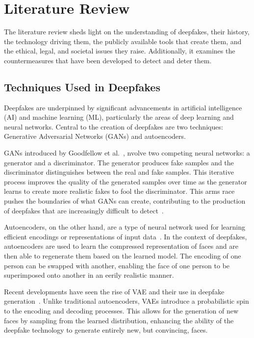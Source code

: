 
\chapter{Literature Review}\label{chapter:literature}
The literature review sheds light on the understanding of deepfakes, their history,
the technology driving them, the publicly available tools that create them, and
the ethical, legal, and societal issues they raise. Additionally, it examines the
countermeasures that have been developed to detect and deter them.

\section{Techniques Used in Deepfakes}\label{chapter:techniques}
Deepfakes are underpinned by significant advancements in artificial intelligence (\ac{AI})
and machine learning (ML), particularly the areas of deep learning and neural
networks. Central to the creation of deepfakes are two techniques:
Generative Adversarial Networks (\ac{GAN}s) and autoencoders.

\ac{GAN}s introduced by Goodfellow et al.~\cite{goodfellow2014generative}, nvolve two
competing neural networks: a generator and a discriminator. The generator produces
fake samples and the discriminator distinguishes between the real and fake samples.
This iterative process improves the quality of the generated samples over time as
the generator learns to create more realistic fakes to fool the discriminator. This
arms race pushes the boundaries of what \ac{GAN}s can create, contributing to the
production of deepfakes that are increasingly difficult to detect~\cite{brock2019large}.

Autoencoders, on the other hand, are a type of neural network used for learning
efficient encodings or representations of input data~\cite{doi:10.1126/science.1127647}.
In the context of deepfakes, autoencoders are used to learn the compressed
representation of faces and are then able to regenerate them based on the learned model.
The encoding of one person can be swapped with another, enabling the face of one person
to be superimposed onto another in an eerily realistic manner.

Recent developments have seen the rise of \ac{VAE} and their use in deepfake
generation~\cite{kingma2022autoencoding}. Unlike traditional autoencoders, \ac{VAE}s introduce
a probabilistic spin to the encoding and decoding processes. This allows for the
generation of new faces by sampling from the learned distribution, enhancing the
ability of the deepfake technology to generate entirely new, but convincing, faces.

